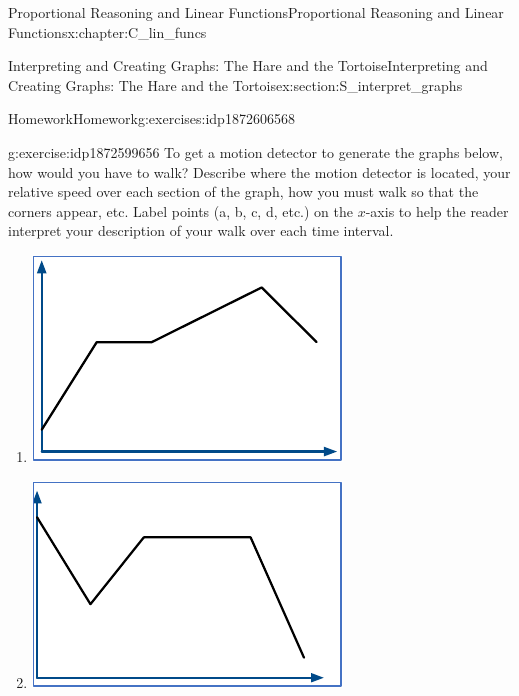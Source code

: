 \documentclass[oneside,10pt,]{book}
\numberwithin{equation}{chapter}
\begin{document}
\begin{chapterptx}{Proportional Reasoning and Linear Functions}{}{Proportional Reasoning and Linear Functions}{}{}{x:chapter:C_lin_funcs}
\begin{sectionptx}{Interpreting and Creating Graphs: The Hare and the Tortoise}{}{Interpreting and Creating Graphs: The Hare and the Tortoise}{}{}{x:section:S_interpret_graphs}
\begin{exercises-subsection}{Homework}{}{Homework}{}{}{g:exercises:idp1872606568}
\begin{divisionexercise}{1}{}{}{g:exercise:idp1872599656}
To get a motion detector to generate the graphs below, how would you have to walk? Describe where the motion detector is located, your relative speed over each section of the graph, how you must walk so that the corners appear, etc. Label points (a, b, c, d, etc.) on the \(x\)-axis to help the reader interpret your description of your walk over each time interval.%
\begin{enumerate}[font=\bfseries,label=(\alph*),ref=\alph*]
\item{}\begin{image}{0.25}{0.5}{0.25}%
\includegraphics[width=\linewidth]{external/exer-walk-graphs-1.pdf}
\end{image}%
%
\item{}\begin{image}{0.25}{0.5}{0.25}%
\includegraphics[width=\linewidth]{external/exer-walk-graphs-2.pdf}
\end{image}%

\end{enumerate}
\end{divisionexercise}
\end{exercises-subsection}
\end{sectionptx}
\end{chapterptx}
\end{document}
